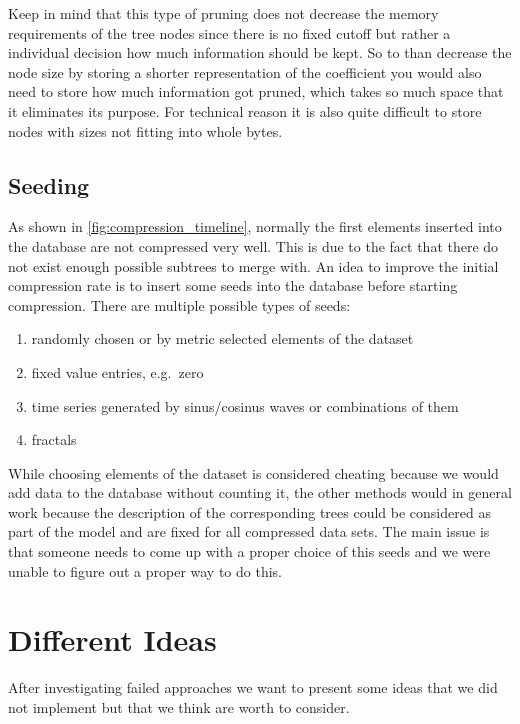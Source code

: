 Keep in mind that this type of pruning does not decrease the memory requirements of the tree nodes since there is no fixed cutoff but rather a individual decision how much information should be kept. So to than decrease the node size by storing a shorter representation of the coefficient you would also need to store how much information got pruned, which takes so much space that it eliminates its purpose. For technical reason it is also quite difficult to store nodes with sizes not fitting into whole bytes.


\subsection{Seeding}
\label{ssec:algorithm:fail:seed}

As shown in \autoref{fig:compression_timeline}, normally the first elements inserted into the database are not compressed very well. This is due to the fact that there do not exist enough possible subtrees to merge with. An idea to improve the initial compression rate is to insert some seeds into the database before starting compression. There are multiple possible types of seeds:

\begin{enumerate}
    \item randomly chosen or by metric selected elements of the dataset
    \item fixed value entries, e.g.\ zero
    \item time series generated by sinus/cosinus waves or combinations of them
    \item fractals
\end{enumerate}

While choosing elements of the dataset is considered cheating because we would add data to the database without counting it, the other methods would in general work because the description of the corresponding trees could be considered as part of the model and are fixed for all compressed data sets. The main issue is that someone needs to come up with a proper choice of this seeds and we were unable to figure out a proper way to do this.



\section{Different Ideas}
\label{sec:algorithm:alternatives}

After investigating failed approaches we want to present some ideas that we did not implement but that we think are worth to consider.

